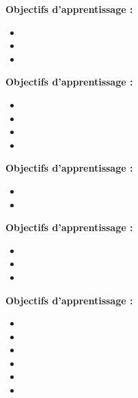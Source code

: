 \par\noindent\textbf{Objectifs d'apprentissage :}
\begin{itemize}
    \item \useobj[C4A2da]
    \item \useobj[C4A2db]
    \item \useobj[C4B2eb]
\end{itemize}
\endsequence

\par\noindent\textbf{Objectifs d'apprentissage :}
\begin{itemize}
    \item \useobj[C4A2ca]
    \item \useobj[C4A2cb]
    \item \useobj[C4A2cc]
    \item \useobj[C4A2cd]
\end{itemize}
\endsequence

\par\noindent\textbf{Objectifs d'apprentissage :}
\begin{itemize}
    \item \useobj[C4B2eb]
    \item \useobj[C4B2ec]
\end{itemize}
\endsequence

\par\noindent\textbf{Objectifs d'apprentissage :}
\begin{itemize}
    \item \useobj[C4A2ea]
    \item \useobj[C4A2eb]
    \item \useobj[C4A2ec]
\end{itemize}
\endsequence

\par\noindent\textbf{Objectifs d'apprentissage :}
\begin{itemize}
    \item \useobj[C4C2ba]
    \item \useobj[C4C2bb]
    \item \useobj[C4C2bc]
    \item \useobj[C4C2bd]
    \item \useobj[C4C2be]
    \item \useobj[C4C2bf]
\end{itemize}
\endsequence

